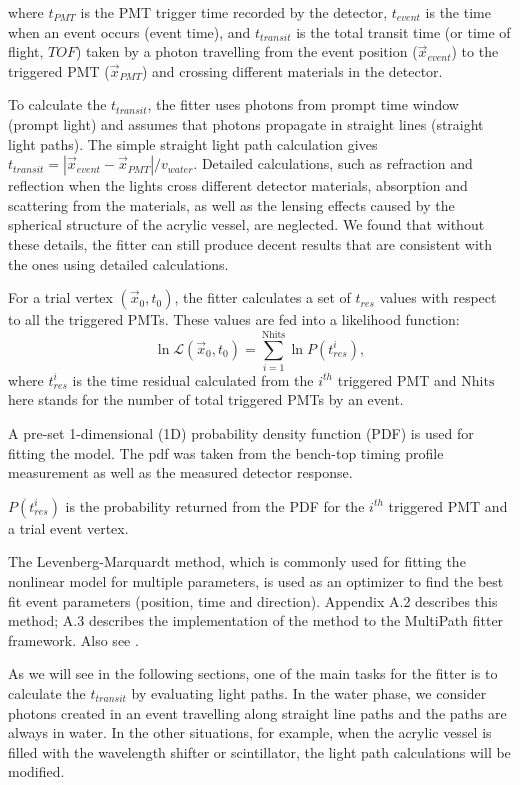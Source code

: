 where $t_{PMT}$ is the PMT trigger time recorded by the detector, $t_{event}$ is the time when an event occurs (event time), and $t_{transit}$ is the total transit time (or time of flight, $TOF$) taken by a photon travelling from the event position ($\vec{x}_{event}$) to the triggered PMT ($\vec{x}_{PMT}$) and crossing different materials in the detector.

To calculate the $t_{transit}$, the fitter uses photons from prompt time window (prompt light) and assumes that photons propagate in straight lines (straight light paths). The simple straight light path calculation gives $t_{transit}=|\vec{x}_{event}-\vec{x}_{PMT}|/v_{water}$. Detailed calculations, such as refraction and reflection when the lights cross different detector materials, absorption and scattering from the materials, as well as the lensing effects caused by the spherical structure of the acrylic vessel, are neglected. We found that without these details, the fitter can still produce decent results that are consistent with the ones using detailed calculations. 

For a trial vertex $(\vec{x}_0,t_0)$, the fitter calculates a set of $t_{res}$ values with respect to all the triggered PMTs. These values are fed into a likelihood function: 
\begin{equation}
\ln\mathcal{L}(\vec{x}_0,t_0)=\sum_{i=1}^{{\mathrm{Nhits}}}\ln P(t^i_{res}),
\end{equation}
where $t^i_{res}$ is the time residual calculated from the $i^{th}$ triggered PMT and $\mathrm{Nhits}$ here stands for the number of total triggered PMTs by an event.

A pre-set 1-dimensional (1D) probability density function (PDF) is used for fitting the model. The pdf was taken from the bench-top timing profile measurement as well as the measured detector response.

$P(t^i_{res})$ is the probability returned from the PDF for the $i^{th}$ triggered PMT and a trial event vertex.

The Levenberg-Marquardt method, which is commonly used for fitting the nonlinear model for multiple parameters, is used as an optimizer to find the best fit event parameters (position, time and direction). Appendix A.2 describes this method; A.3 describes the implementation of the method to the MultiPath fitter framework. Also see \cite{gregory2005bayesian, press2007numerical}.

As we will see in the following sections, one of the main tasks for the fitter is to calculate the $t_{transit}$ by evaluating light paths. In the water phase, we consider photons created in an event travelling along straight line paths and the paths are always in water. In the other situations, for example, when the acrylic vessel is filled with the wavelength shifter or scintillator, the light path calculations will be modified.   

